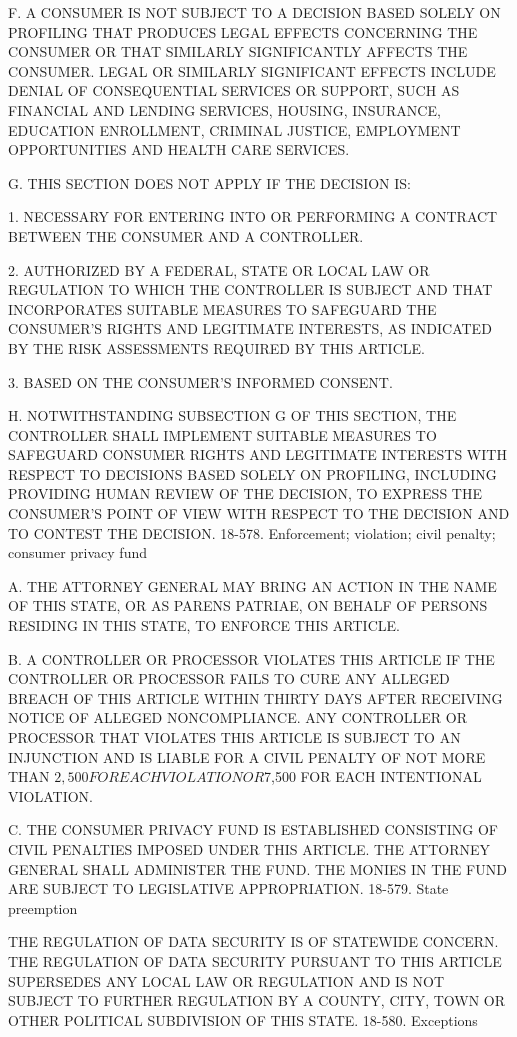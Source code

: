 F. A CONSUMER IS NOT SUBJECT TO A DECISION BASED SOLELY ON PROFILING THAT PRODUCES LEGAL EFFECTS CONCERNING THE CONSUMER OR THAT SIMILARLY SIGNIFICANTLY AFFECTS THE CONSUMER. LEGAL OR SIMILARLY SIGNIFICANT EFFECTS INCLUDE DENIAL OF CONSEQUENTIAL SERVICES OR SUPPORT, SUCH AS FINANCIAL AND LENDING SERVICES, HOUSING, INSURANCE, EDUCATION ENROLLMENT, CRIMINAL JUSTICE, EMPLOYMENT OPPORTUNITIES AND HEALTH CARE SERVICES.

G. THIS SECTION DOES NOT APPLY IF THE DECISION IS:

1. NECESSARY FOR ENTERING INTO OR PERFORMING A CONTRACT BETWEEN THE CONSUMER AND A CONTROLLER.

2. AUTHORIZED BY A FEDERAL, STATE OR LOCAL LAW OR REGULATION TO WHICH THE CONTROLLER IS SUBJECT AND THAT INCORPORATES SUITABLE MEASURES TO SAFEGUARD THE CONSUMER'S RIGHTS AND LEGITIMATE INTERESTS, AS INDICATED BY THE RISK ASSESSMENTS REQUIRED BY THIS ARTICLE.

3. BASED ON THE CONSUMER'S INFORMED CONSENT.

H. NOTWITHSTANDING SUBSECTION G OF THIS SECTION, THE CONTROLLER SHALL IMPLEMENT SUITABLE MEASURES TO SAFEGUARD CONSUMER RIGHTS AND LEGITIMATE INTERESTS WITH RESPECT TO DECISIONS BASED SOLELY ON PROFILING, INCLUDING PROVIDING HUMAN REVIEW OF THE DECISION, TO EXPRESS THE CONSUMER'S POINT OF VIEW WITH RESPECT TO THE DECISION AND TO CONTEST THE DECISION.
18-578. Enforcement; violation; civil penalty; consumer privacy fund

A. THE ATTORNEY GENERAL MAY BRING AN ACTION IN THE NAME OF THIS STATE, OR AS PARENS PATRIAE, ON BEHALF OF PERSONS RESIDING IN THIS STATE, TO ENFORCE THIS ARTICLE.

B. A CONTROLLER OR PROCESSOR VIOLATES THIS ARTICLE IF THE CONTROLLER OR PROCESSOR FAILS TO CURE ANY ALLEGED BREACH OF THIS ARTICLE WITHIN THIRTY DAYS AFTER RECEIVING NOTICE OF ALLEGED NONCOMPLIANCE. ANY CONTROLLER OR PROCESSOR THAT VIOLATES THIS ARTICLE IS SUBJECT TO AN INJUNCTION AND IS LIABLE FOR A CIVIL PENALTY OF NOT MORE THAN $2,500 FOR EACH VIOLATION OR $7,500 FOR EACH INTENTIONAL VIOLATION.

C. THE CONSUMER PRIVACY FUND IS ESTABLISHED CONSISTING OF CIVIL PENALTIES IMPOSED UNDER THIS ARTICLE. THE ATTORNEY GENERAL SHALL ADMINISTER THE FUND. THE MONIES IN THE FUND ARE SUBJECT TO LEGISLATIVE APPROPRIATION.
18-579. State preemption

THE REGULATION OF DATA SECURITY IS OF STATEWIDE CONCERN. THE REGULATION OF DATA SECURITY PURSUANT TO THIS ARTICLE SUPERSEDES ANY LOCAL LAW OR REGULATION AND IS NOT SUBJECT TO FURTHER REGULATION BY A COUNTY, CITY, TOWN OR OTHER POLITICAL SUBDIVISION OF THIS STATE.
18-580. Exceptions

